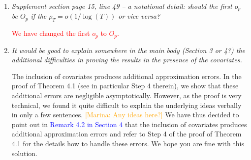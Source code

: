 \documentclass[a4paper,12pt]{article}
\begin{document}
\begin{enumerate}[label=\arabic*.,leftmargin=0.6cm]



\item \textit{Supplement section page 15, line 49 -- a notational detail: should the first $o_p$ be $O_p$ if the $\rho_T = o(1/ \log(T))$ or vice versa?}  

\textcolor{red}{We have changed the first $o_p$ to $O_p$.} 


\item \textit{It would be good to explain somewhere in the main body (Section 3 or 4?) the additional difficulties in proving the results in the presence of the covariates.}
  
The inclusion of covariates produces additional approximation errors. In the proof of Theorem 4.1 (see in particular Step 4 therein), we show that these additional errors are negligible asymptotically. However, as the proof is very technical, we found it quite difficult to explain the underlying ideas verbally in only a few sentences. \textcolor{orange}{[Marina: Any ideas here?]} We have thus decided to point out in \textcolor{blue}{Remark 4.2 in Section 4} that the inclusion of covariates produces additional approximation errors and refer to Step 4 of the proof of Theorem 4.1 for the details how to handle these errors. We hope you are fine with this solution.  
  
\end{enumerate}

\pagebreak

\vspace{10pt}

{\small
\setlength{\bibsep}{0.55em}
}
\end{document}
